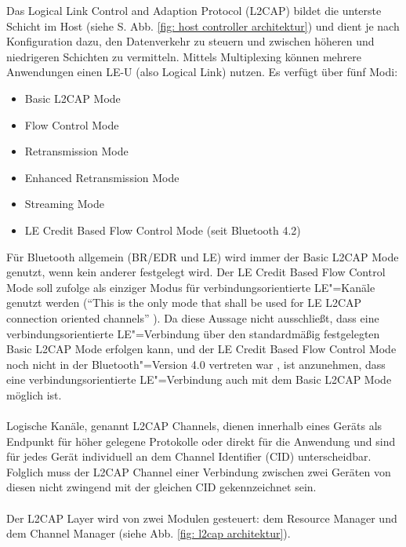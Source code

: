 Das Logical Link Control and Adaption Protocol (L2CAP) bildet die unterste Schicht im Host (siehe S. \pageref{fig: host controller architektur} Abb. \ref{fig: host controller architektur}) und dient je nach Konfiguration dazu, den Datenverkehr zu steuern und zwischen höheren und niedrigeren Schichten zu vermitteln. Mittels Multiplexing können mehrere Anwendungen einen LE-U (also Logical Link) nutzen.
Es verfügt über fünf Modi:
\begin{itemize}
    \item Basic L2CAP Mode
    \item Flow Control Mode
    \item Retransmission Mode
    \item Enhanced Retransmission Mode
    \item Streaming Mode
    \item LE Credit Based Flow Control Mode (seit Bluetooth 4.2)
\end{itemize}
Für Bluetooth allgemein (BR/EDR und LE) wird immer der Basic L2CAP Mode genutzt, wenn kein anderer festgelegt wird. Der LE Credit Based Flow Control Mode soll \cite{BtSpec4.2_1735} zufolge als einziger Modus für verbindungsorientierte LE"=Kanäle genutzt werden ("`This is the only mode that shall be used for LE L2CAP connection oriented channels"' \cite{BtSpec4.2_1735}). Da diese Aussage nicht ausschließt, dass eine verbindungsorientierte LE"=Verbindung über den standardmäßig festgelegten Basic L2CAP Mode erfolgen kann, und der LE Credit Based Flow Control Mode noch nicht in der Bluetooth"=Version 4.0 vertreten war \cite{BtSpec4.0_1401}, ist anzunehmen, dass eine verbindungsorientierte LE"=Verbindung auch mit dem Basic L2CAP Mode möglich ist.
\\\\
Logische Kanäle, genannt L2CAP Channels, dienen innerhalb eines Geräts als Endpunkt für höher gelegene Protokolle oder direkt für die Anwendung und sind für jedes Gerät individuell an dem Channel Identifier (CID) unterscheidbar. Folglich muss der L2CAP Channel einer Verbindung zwischen zwei Geräten von diesen nicht zwingend mit der gleichen CID gekennzeichnet sein.
\\\\
Der L2CAP Layer wird von zwei Modulen gesteuert: dem Resource Manager und dem Channel Manager (siehe Abb. \ref{fig: l2cap architektur}).

